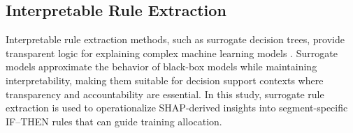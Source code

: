 \subsection{Interpretable Rule Extraction}

Interpretable rule extraction methods, such as surrogate decision trees, provide transparent logic for explaining complex machine learning models \citep{molnar2022interpretable}. Surrogate models approximate the behavior of black-box models while maintaining interpretability, making them suitable for decision support contexts where transparency and accountability are essential. In this study, surrogate rule extraction is used to operationalize SHAP-derived insights into segment-specific IF–THEN rules that can guide training allocation.
